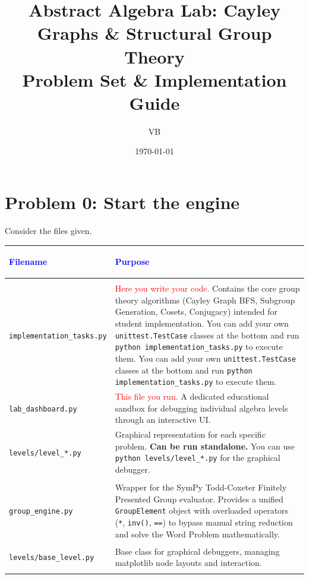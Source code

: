 \documentclass[11pt]{article}
\title{Abstract Algebra Lab: Cayley Graphs \& Structural Group Theory \\ \large Problem Set \& Implementation Guide}
\author{VB}
\date{\today}
\begin{document}
\maketitle

\section*{Problem 0: Start the engine}

Consider the files given.
\begin{center}
\renewcommand{\arraystretch}{1.5}
\begin{tabularx}{\textwidth}{@{} >{\bfseries\raggedright\arraybackslash}p{5.5cm} X @{}}
\toprule
\textcolor{blue}{Filename} & \textcolor{blue}{Purpose} \\ \midrule
\multicolumn{2}{@{}l}{\textbf{Direct Interaction}} \\ \midrule
\lstinline|implementation_tasks.py| & \textcolor{red}{Here you write your code.} Contains the core group theory algorithms (Cayley Graph BFS, Subgroup Generation, Cosets, Conjugacy) intended for student implementation. You can add your own \lstinline|unittest.TestCase| classes at the bottom and run \lstinline|python implementation_tasks.py| to execute them. You can add your own \lstinline|unittest.TestCase| classes at the bottom and run \lstinline|python implementation_tasks.py| to execute them. \\
\lstinline|lab_dashboard.py| & \textcolor{red}{This file you run.} A dedicated educational sandbox for debugging individual algebra levels through an interactive UI. \\
\lstinline|levels/level_*.py| & Graphical representation for each specific problem. \textbf{Can be run standalone.} You can use \lstinline|python levels/level_*.py| for the graphical debugger. \\ \midrule
\multicolumn{2}{@{}l}{\textbf{Under the Hood}} \\ \midrule
\lstinline|group_engine.py| & Wrapper for the SymPy Todd-Coxeter Finitely Presented Group evaluator. Provides a unified \lstinline|GroupElement| object with overloaded operators (\lstinline|*|, \lstinline|inv()|, \lstinline|==|) to bypass manual string reduction and solve the Word Problem mathematically.\\
\lstinline|levels/base_level.py| & Base class for graphical debuggers, managing matplotlib node layouts and interaction.\\
\bottomrule
\end{tabularx}
\end{center}
\end{document}
